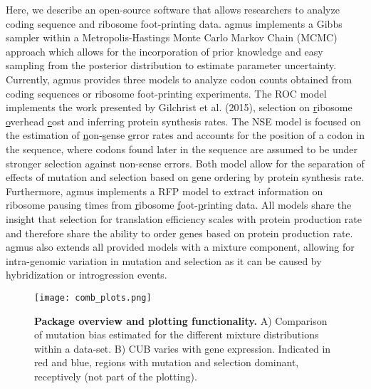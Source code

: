 \documentclass{bioinfo}
\newcommand{\package}{agmus } %
\begin{document}
Here, we describe an open-source software that allows researchers to analyze coding sequence and ribosome foot-printing data. 
\package implements a Gibbs sampler within a Metropolis-Hastings Monte Carlo Markov Chain (MCMC) approach which allows for the incorporation of prior knowledge and easy sampling from the posterior distribution to estimate parameter uncertainty.
Currently, \package provides three models to analyze codon counts obtained from coding sequences or ribosome foot-printing experiments. 
The ROC model implements the work presented by Gilchrist et al. (2015), selection on \underline{r}ibosome \underline{o}verhead \underline{c}ost and inferring protein synthesis rates.
The NSE model is focused on the estimation of \underline{n}on-\underline{s}ense \underline{e}rror rates and accounts for the position of a codon in the sequence, where codons found later in the sequence are assumed to be under stronger selection against non-sense errors.
Both model allow for the separation of effects of mutation and selection based on gene ordering by protein synthesis rate.
Furthermore, \package implements a RFP model to extract information on ribosome pausing times from \underline{r}ibosome \underline{f}oot-\underline{p}rinting data. 
All models share the insight that selection for translation efficiency scales with protein production rate and therefore share the ability to order genes based on protein production rate. 
\package also extends all provided models with a mixture component, allowing for intra-genomic variation in mutation and selection as it can be caused by hybridization or introgression events.

\begin{figure*}[!tpb]
\centering
 \texttt{[image: comb\_plots.png]}
\vspace{-0.2cm}
\caption{\textbf{Package overview and plotting functionality.} A) Comparison of mutation bias estimated for the different mixture distributions within a data-set. B) CUB varies with gene expression. Indicated in red and blue, regions with mutation and selection dominant, receptively (not part of the plotting). 
}
\label{fig:plotbin}
\end{figure*}
\end{document}
